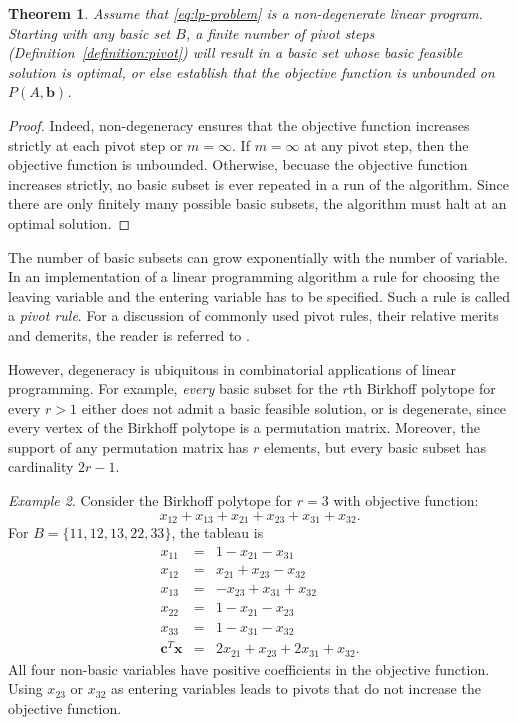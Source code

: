 \documentclass{amsbook}
\newcommand{\xx}{\mathbf x}
\newcommand{\cc}{\mathbf c}
\newcommand{\bb}{\mathbf b}
\newtheorem{theorem}{Theorem}[section]
\theoremstyle{definition}
\theoremstyle{remark}
\newtheorem{example}[theorem]{Example}
\begin{document}
\begin{theorem}
  Assume that \eqref{eq:lp-problem} is a non-degenerate linear program.
  Starting with any basic set $B$, a finite number of pivot steps (Definition~\ref{definition:pivot}) will result in a basic set whose basic feasible solution is optimal, or else establish that the objective function is unbounded on $P(A,\bb)$.
\end{theorem}
\begin{proof}
  Indeed, non-degeneracy ensures that the objective function increases strictly at each pivot step or $m=\infty$.
  If $m=\infty$ at any pivot step, then the objective function is unbounded.
  Otherwise, becuase the objective function increases strictly, no basic subset is ever repeated in a run of the algorithm.
  Since there are only finitely many possible basic subsets, the algorithm must halt at an optimal solution.
\end{proof}
The number of basic subsets can grow exponentially with the number of variable.
In an implementation of a linear programming algorithm a rule for choosing the leaving variable and the entering variable has to be specified.
Such a rule is called a \emph{pivot rule}.
For a discussion of commonly used pivot rules, their relative merits and demerits, the reader is referred to \cite[Section~5.7]{GM}.

However, degeneracy is ubiquitous in combinatorial applications of linear programming.
For example, \emph{every} basic subset for the $r$th Birkhoff polytope for every $r>1$ either does not admit a basic feasible solution, or is degenerate, since every vertex of the Birkhoff polytope is a permutation matrix.
Moreover, the support of any permutation matrix has $r$ elements, but every basic subset has cardinality $2r-1$.
\begin{example}
  Consider the Birkhoff polytope for $r=3$ with objective function:
  \begin{displaymath}
    x_{12}+x_{13}+x_{21}+x_{23}+x_{31}+x_{32}.
  \end{displaymath}
  For $B=\{11,12,13,22,33\}$, the tableau is
  \begin{displaymath}
    \begin{matrix}
      x_{11}&=&1-x_{21}-x_{31}\\
      x_{12}&=&x_{21}+x_{23}-x_{32}\\
      x_{13}&=&-x_{23}+x_{31}+x_{32}\\
      x_{22}&=&1-x_{21}-x_{23}\\
      x_{33}&=&1-x_{31}-x_{32}\\
      \hline
      \cc^T\xx&=&2x_{21}+x_{23}+2x_{31}+x_{32}.
    \end{matrix}
  \end{displaymath}
  All four non-basic variables have positive coefficients in the objective function.
  Using $x_{23}$ or $x_{32}$ as entering variables leads to pivots that do not increase the objective function.
\end{example}
\end{document}
